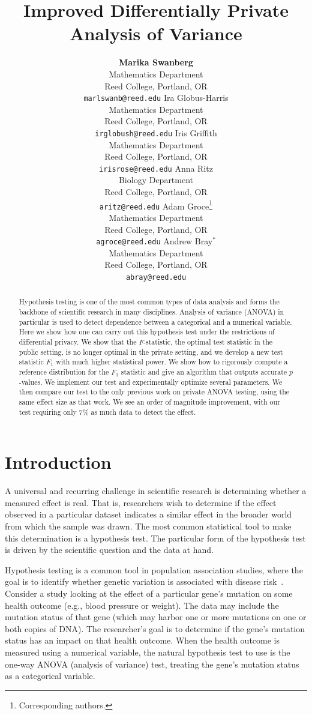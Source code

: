 \documentclass[USenglish,oneside]{article}
\title{Improved Differentially Private Analysis of Variance}
\author{
\textbf{Marika Swanberg}\\
Mathematics Department\\
Reed College, Portland, OR\\
\texttt{marlswanb@reed.edu}
\And
Ira Globus-Harris\\
Mathematics Department\\
Reed College, Portland, OR\\
 \texttt{irglobush@reed.edu}
 \And
 Iris Griffith\\
Mathematics Department\\
Reed College, Portland, OR\\
 \texttt{irisrose@reed.edu}
 \And
 Anna Ritz\\
Biology Department\\
Reed College, Portland, OR\\
 \texttt{aritz@reed.edu}
 \And
 Adam Groce\thanks{Corresponding authors.}\\
Mathematics Department\\
Reed College, Portland, OR\\
 \texttt{agroce@reed.edu} 
 \And
 Andrew Bray$^*$\\
Mathematics Department\\
Reed College, Portland, OR\\
\texttt{abray@reed.edu}
}
\date{}
\newcounter{ag}
\newcounter{ab}
\newcounter{ar}
\newcounter{igh}
\newcounter{ms}
\begin{document}
\maketitle

\begin{abstract}
{Hypothesis testing is one of the most common types of data analysis and forms the backbone of scientific research in many disciplines.  Analysis of variance (ANOVA) in particular is used to detect dependence between a categorical and a numerical variable.  Here we show how one can carry out this hypothesis test under the restrictions of differential privacy.  We show that the $F$-statistic, the optimal test statistic in the public setting, is no longer optimal in the private setting, and we develop a new test statistic $F_1$ with much higher statistical power.  We show how to rigorously compute a reference distribution for the $F_1$ statistic and give an algorithm that outputs accurate $p$-values.  We implement our test and experimentally optimize several parameters.  We then compare our test to the only previous work on private ANOVA testing, using the same effect size as that work.  We see an order of magnitude improvement, with our test requiring only 7\% as much data to detect the effect.}
\end{abstract}


\section{Introduction}

A universal and recurring challenge in scientific research is determining whether a measured effect is real.  That is, researchers wish to determine if the effect observed in a particular dataset indicates a similar effect in the broader world from which the sample was drawn. The most common statistical tool to make this determination is a hypothesis test.
The particular form of the hypothesis test is driven by the scientific question and the data at hand. 

Hypothesis testing is a common tool in population association studies, where the goal is to identify whether genetic variation is associated with disease risk~\cite{balding2006tutorial}.  Consider a study looking at the effect of a particular gene's mutation on some health outcome (e.g., blood pressure or weight).  The data may include the mutation status of that gene (which may harbor one or more mutations on one or both copies of DNA).  
The researcher's goal is to determine if the gene's mutation status has an impact on that health outcome.  When the health outcome is measured using a numerical variable, the natural hypothesis test to use is the one-way ANOVA (analysis of variance) test, treating the gene's mutation status as a categorical variable.
\end{document}

